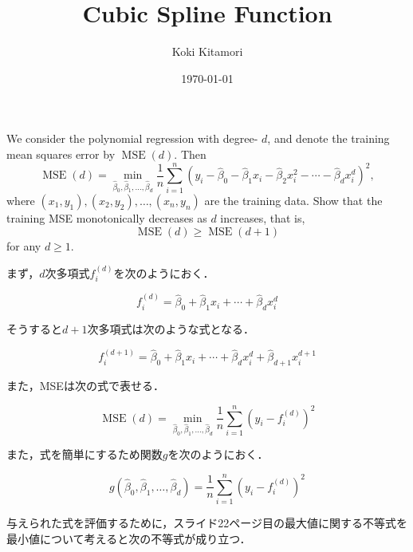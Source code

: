 \documentclass[dvipdfmx]{ujarticle}
\begin{document}
\author{Koki Kitamori}
\title{Cubic Spline Function}
\date{\today}
\maketitle

\begin{screen}
We consider the polynomial regression with degree- $d$, and denote the training mean squares error by $\operatorname{MSE}(d)$. Then
\[
\operatorname{MSE}(d)=\min _{\widehat{\beta}_{0}, \widehat{\beta}_{1}, \ldots, \widehat{\beta}_{d}} \frac{1}{n} \sum_{i=1}^{n}\left(y_{i}-\widehat{\beta}_{0}-\widehat{\beta}_{1} x_{i}-\widehat{\beta}_{2} x_{i}^{2}-\cdots-\widehat{\beta}_{d} x_{i}^{d}\right)^{2},
\]
where $\left(x_{1}, y_{1}\right),\left(x_{2}, y_{2}\right), \ldots,\left(x_{n}, y_{n}\right)$ are the training data.
Show that the training MSE monotonically decreases as $d$ increases, that is, \[
\operatorname{MSE}(d) \geq \operatorname{MSE}(d+1)
\]for any $d \geq 1$.
\end{screen}

まず，$d$次多項式$f_i^{(d)}$を次のようにおく．

\begin{equation}
f_{i}^{(d)}=\widehat{\beta}_{0}+\widehat{\beta}_{1} x_{i}+\cdots+\widehat{\beta}_{d} x_{i}^{d}
\end{equation}

そうすると$d+1$次多項式は次のような式となる．

\begin{equation}
  f_{i}^{(d+1)}=\widehat{\beta}_{0}+\widehat{\beta}_{1} x_{i}+\cdots+\widehat{\beta}_{d} x_{i}^{d} + \widehat{\beta}_{d+1} x_{i}^{d+1}
\end{equation}

また，MSEは次の式で表せる．

\begin{equation}
\operatorname{MSE}(d)=\min _{\widehat{\beta}_{0}, \widehat{\beta}_{1}, \ldots, \widehat{\beta}_{d}}  \frac{1}{n} \sum_{i=1}^{n}\left(y_{i}-f_{i}^{(d)}\right)^{2}
\end{equation}

また，式を簡単にするため関数$g$を次のようにおく．

\begin{equation}
  g(\widehat{\beta}_{0}, \widehat{\beta}_{1}, \ldots, \widehat{\beta}_{d}) = \frac{1}{n} \sum_{i=1}^{n}\left(y_{i}-f_{i}^{(d)}\right)^{2}
\end{equation}

与えられた式を評価するために，スライド22ページ目の最大値に関する不等式を最小値について考えると次の不等式が成り立つ．
\end{document}
